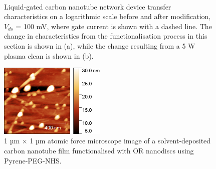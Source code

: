 \documentclass[
  a4paper,
]{scrbook}
\begin{document}
\begin{figure}
\begin{minipage}[t]{0.45\linewidth}
{{}

}

\end{minipage}%
%
\begin{minipage}[t]{0.01\linewidth}

{\centering 

~

}

\end{minipage}%

\caption{\label{fig-OR10a-TX-comparison}Liquid-gated carbon nanotube
network device transfer characteristics on a logarithmic scale before
and after modification, \(V_{ds}\) = 100 mV, where gate current is shown
with a dashed line. The change in characteristics from the
functionalisation process in this section is shown in (a), while the
change resulting from a 5 W plasma clean is shown in (b).}

\end{figure}

\begin{figure}

{\centering \includegraphics[width=0.45\textwidth,height=\textheight]{figures/ch7/Ned_funcverification_PPNHSwamine_R_1um_20220414_00466.png}

}

\caption{\label{fig-PPN-linker}1 µm \(\times\) 1 µm atomic force
microscope image of a solvent-deposited carbon nanotube film
functionalised with OR nanodiscs using Pyrene-PEG-NHS.}

\end{figure}
\end{document}
